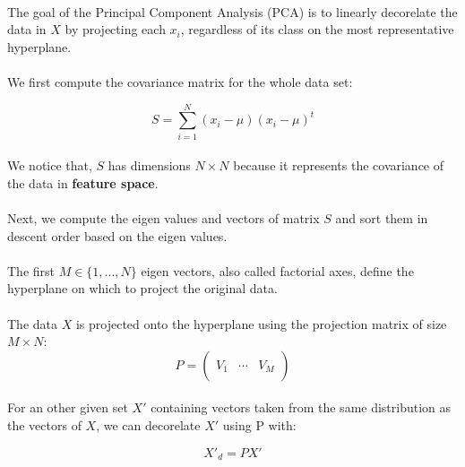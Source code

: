 
\paragraph{}
The goal of the Principal Component Analysis (PCA) is to linearly decorelate the data in $X$ by projecting each $x_i$, regardless of its class on the most representative hyperplane.

\paragraph{}
We first compute the covariance matrix for the whole data set:

$$ S = \sum_{i = 1}^N (x_i - \mu)(x_i - \mu)^t $$

\paragraph{}
We notice that, $S$ has dimensions $N \times N$ because it represents the covariance of the data in \textbf{feature space}.

\paragraph{}
Next, we compute the eigen values and vectors of matrix $S$ and sort them in descent order based on the eigen values.

\paragraph{}
The first $M \in \{1, \ldots, N\}$ eigen vectors, also called factorial axes, define the hyperplane on which to project the original data.

\paragraph{}
The data $X$ is projected onto the hyperplane using the projection matrix of size $M \times N$:
$$ P = \left( \begin{array}{ccc}
 &  &  \\
V_1 & \cdots & V_M \\
 &  &  \end{array} \right) $$ 

\paragraph{}
For an other given set $X'$ containing vectors taken from the same distribution as the vectors of $X$, we can decorelate $X'$ using P with:

$$ X'_d = PX'$$
